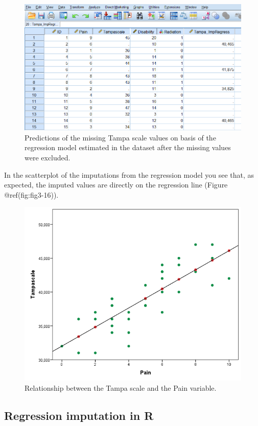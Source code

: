\documentclass[
]{book}
\begin{document}
\begin{figure}

{\centering \includegraphics[width=0.7\linewidth]{images/fig3.15} 

}

\caption{Predictions of the missing Tampa scale values on basis of the regression model estimated in the dataset after the missing values were excluded.}\label{fig:fig3-15}
\end{figure}

In the scatterplot of the imputations from the regression model you see
that, as expected, the imputed values are directly on the regression
line (Figure @ref(fig:fig3-16)).

\begin{figure}

{\centering \includegraphics[width=0.7\linewidth]{images/fig3.16} 

}

\caption{Relationship between the Tampa scale and the Pain variable.}\label{fig:fig3-16}
\end{figure}

\hypertarget{regression-imputation-in-r}{%
\subsection{Regression imputation in
R}\label{regression-imputation-in-r}}
\end{document}
